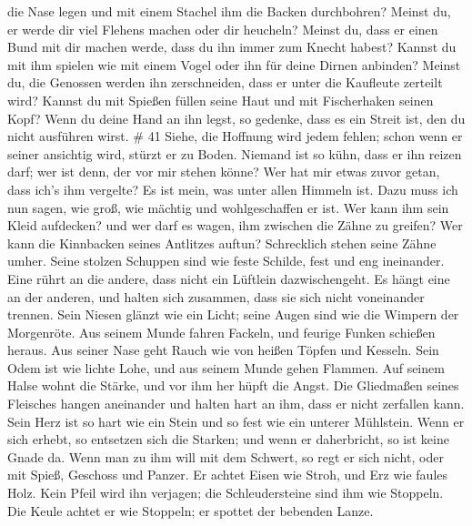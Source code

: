 die Nase legen und mit einem Stachel ihm die Backen durchbohren?
 Meinst du, er werde dir viel Flehens machen oder dir
heucheln?  Meinst du, dass er einen Bund mit dir machen
werde, dass du ihn immer zum Knecht habest?  Kannst du mit
ihm spielen wie mit einem Vogel oder ihn für deine Dirnen anbinden?
 Meinst du, die Genossen werden ihn zerschneiden, dass er
unter die Kaufleute zerteilt wird?  Kannst du mit Spießen
füllen seine Haut und mit Fischerhaken seinen Kopf?  Wenn
du deine Hand an ihn legst, so gedenke, dass es ein Streit ist, den du
nicht ausführen wirst. \# 41  Siehe, die Hoffnung wird jedem
fehlen; schon wenn er seiner ansichtig wird, stürzt er zu Boden.
 Niemand ist so kühn, dass er ihn reizen darf; wer ist denn,
der vor mir stehen könne?  Wer hat mir etwas zuvor getan,
dass ich's ihm vergelte? Es ist mein, was unter allen Himmeln ist.
 Dazu muss ich nun sagen, wie groß, wie mächtig und
wohlgeschaffen er ist.  Wer kann ihm sein Kleid aufdecken?
und wer darf es wagen, ihm zwischen die Zähne zu greifen? 
Wer kann die Kinnbacken seines Antlitzes auftun? Schrecklich stehen
seine Zähne umher.  Seine stolzen Schuppen sind wie feste
Schilde, fest und eng ineinander.  Eine rührt an die andere,
dass nicht ein Lüftlein dazwischengeht.  Es hängt eine an
der anderen, und halten sich zusammen, dass sie sich nicht voneinander
trennen.  Sein Niesen glänzt wie ein Licht; seine Augen
sind wie die Wimpern der Morgenröte.  Aus seinem Munde
fahren Fackeln, und feurige Funken schießen heraus.  Aus
seiner Nase geht Rauch wie von heißen Töpfen und Kesseln. 
Sein Odem ist wie lichte Lohe, und aus seinem Munde gehen Flammen.
 Auf seinem Halse wohnt die Stärke, und vor ihm her hüpft
die Angst.  Die Gliedmaßen seines Fleisches hangen
aneinander und halten hart an ihm, dass er nicht zerfallen kann.
 Sein Herz ist so hart wie ein Stein und so fest wie ein
unterer Mühlstein.  Wenn er sich erhebt, so entsetzen sich
die Starken; und wenn er daherbricht, so ist keine Gnade da.
 Wenn man zu ihm will mit dem Schwert, so regt er sich
nicht, oder mit Spieß, Geschoss und Panzer.  Er achtet
Eisen wie Stroh, und Erz wie faules Holz.  Kein Pfeil wird
ihn verjagen; die Schleudersteine sind ihm wie Stoppeln. 
Die Keule achtet er wie Stoppeln; er spottet der bebenden Lanze.
